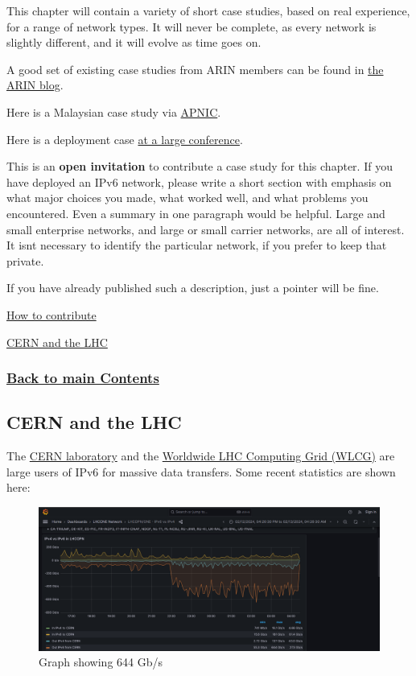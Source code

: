 \documentclass[
]{article}
\begin{document}
This chapter will contain a variety of short case studies, based on real
experience, for a range of network types. It will never be complete, as
every network is slightly different, and it will evolve as time goes on.

A good set of existing case studies from ARIN members can be found in
\href{https://www.arin.net/blog/ipv6/}{the ARIN blog}.

Here is a Malaysian case study via
\href{https://blog.apnic.net/2023/03/17/telekom-malaysias-ipv6-readiness-journey/}{APNIC}.

Here is a deployment case
\href{https://nsrc.org/blog/apricot-ipv6-only}{at a large conference}.

This is an \textbf{open invitation} to contribute a case study for this
chapter. If you have deployed an IPv6 network, please write a short
section with emphasis on what major choices you made, what worked well,
and what problems you encountered. Even a summary in one paragraph would
be helpful. Large and small enterprise networks, and large or small
carrier networks, are all of interest. It isn\textquotesingle t
necessary to identify the particular network, if you prefer to keep that
private.

If you have already published such a description, just a pointer will be
fine.

\href{https://github.com/becarpenter/book6/blob/main/1.\%20Introduction\%20and\%20Foreword/How\%20to\%20contribute.md\#how-to-contribute}{How
to contribute}

\hyperref[cern-and-the-lhc]{CERN and the LHC}

\subsubsection{\texorpdfstring{\hyperref[list-of-contents]{Back to main
Contents}}{Back to main Contents}}\label{back-to-main-contents-6}

\pagebreak

\subsection{CERN and the LHC}\label{cern-and-the-lhc}

The \href{https://www.cern.ch}{CERN laboratory} and the
\href{https://home.cern/science/computing/grid}{Worldwide LHC Computing
Grid (WLCG)} are large users of IPv6 for massive data transfers. Some
recent statistics are shown here:

\begin{figure}
\centering
\includegraphics{CERN-IPv6-Feb24.png}
\caption{Graph showing 644 Gb/s}
\end{figure}
\end{document}
